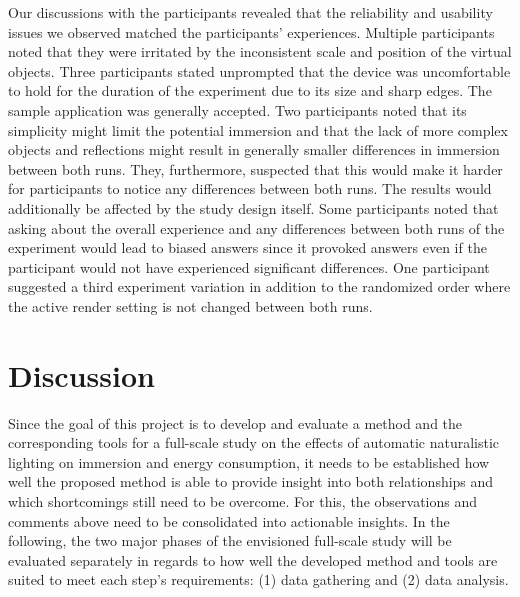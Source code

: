 \documentclass[12pt,twoside,english]{article}
\begin{document}
Our discussions with the participants revealed that the reliability and usability issues we observed matched the participants' experiences.
Multiple participants noted that they were irritated by the inconsistent scale and position of the virtual objects.
Three participants stated unprompted that the device was uncomfortable to hold for the duration of the experiment due to its size and sharp edges.
The sample application was generally accepted.
Two participants noted that its simplicity might limit the potential immersion and that the lack of more complex objects and reflections might result in generally smaller differences in immersion between both runs.
They, furthermore, suspected that this would make it harder for participants to notice any differences between both runs.
The results would additionally be affected by the study design itself.
Some participants noted that asking about the overall experience and any differences between both runs of the experiment would lead to biased answers since it provoked answers even if the participant would not have experienced significant differences.
One participant suggested a third experiment variation in addition to the randomized order where the active render setting is not changed between both runs.

\section{Discussion}
\label{sect:discussion}

Since the goal of this project is to develop and evaluate a method and the corresponding tools for a full-scale study on the effects of automatic naturalistic lighting on immersion and energy consumption, it needs to be established how well the proposed method is able to provide insight into both relationships and which shortcomings still need to be overcome.
For this, the observations and comments above need to be consolidated into actionable insights.
In the following, the two major phases of the envisioned full-scale study will be evaluated separately in regards to how well the developed method and tools are suited to meet each step's requirements: (1) data gathering and (2) data analysis.
\end{document}
